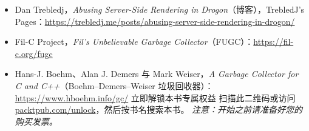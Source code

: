 \begin{itemize}
\item Dan Trebledj，\emph{Abusing Server-Side Rendering in Drogon}（博客），TrebledJ’s Pages：\href{https://trebledj.me/posts/abusing-server-side-rendering-in-drogon/}{https://trebledj.me/posts/abusing-server-side-rendering-in-drogon/}
\item Fil-C Project，\emph{Fil’s Unbelievable Garbage Collector}（FUGC）：\href{https://fil-c.org/fugc }{https://fil-c.org/fugc}
\item Hans-J. Boehm、Alan J. Demers 与 Mark Weiser，\emph{A Garbage Collector for C and C++}（Boehm–Demers–Weiser 垃圾回收器）：\href{https://www.hboehm.info/gc/}{https://www.hboehm.info/gc/} 立即解锁本书专属权益 扫描此二维码或访问 \href{http://packtpub.com/unlock}{packtpub.com/unlock}，然后按书名搜索本书。 \emph{注意：开始之前请准备好您的购买发票。}
\end{itemize}

